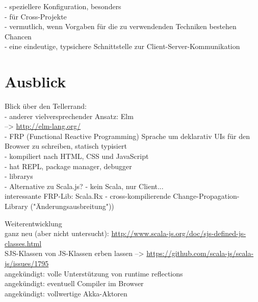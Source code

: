 \documentclass[a4paper, 12pt, hidelinks, listof=totoc, listoftables=totoc, bibliography=totoc]{scrreprt}
\begin{document}
- speziellere Konfiguration, besonders \\
  - für Cross-Projekte \\
  - vermutlich, wenn Vorgaben für die zu verwendenden Techniken bestehen \\

Chancen \\

- eine eindeutige, typsichere Schnittstelle zur Client-Server-Kommunikation \\





\section{Ausblick}

Blick über den Tellerrand: \\
- anderer vielversprechender Ansatz: Elm \\
	-->  \url{http://elm-lang.org/} \\
	- FRP (Functional Reactive Programming) Sprache um deklarativ UIs für den Browser zu schreiben, statisch typisiert \\
	- kompiliert nach HTML, CSS und JavaScript \\
	- hat \ac{REPL}, package manager, debugger \\
	- librarys \\
	- Alternative zu Scala.js? - kein Scala, nur Client... \\

interessante FRP-Lib: Scala.Rx
- cross-kompilierende Change-Propagation-Library ("Änderungsausbreitung"))



Weiterentwicklung \\

	ganz neu (aber nicht untersucht): \url{http://www.scala-js.org/doc/sjs-defined-js-classes.html} \\
	SJS-Klassen von JS-Klassen erben lassen  -->  \url{https://github.com/scala-js/scala-js/issues/1795} \\
	
	
	angekündigt: volle Unterstützung von runtime reflections\cite[S. 2]{doeraene2013.TDI} \\
	angekündigt: eventuell Compiler im Browser\cite[Folie 39, Min. 39]{doeraene2014.WHB} \\
	angekündigt: vollwertige Akka-Aktoren\cite[Folie 39, Min. 39]{doeraene2014.WHB} \\
	
\end{document}
